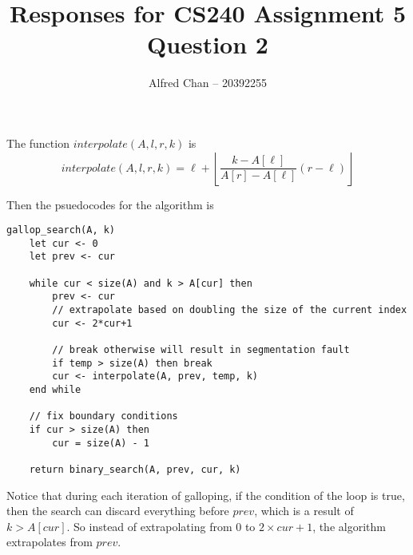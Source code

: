 \documentclass[12pt]{article}
\title{Responses for CS240 Assignment 5 Question 2}
\author{Alfred Chan -- 20392255}
\begin{document}
\maketitle

The function $interpolate(A, l, r, k)$ is
\begin{equation}
interpolate(A, l, r, k) = \ell+\left\lfloor\frac{k-A[\ell]}{A[r]-A[\ell]}(r-\ell)\right\rfloor
\end{equation}

Then the psuedocodes for the algorithm is
\begin{lstlisting}
gallop_search(A, k)
	let cur <- 0
	let prev <- cur

	while cur < size(A) and k > A[cur] then
		prev <- cur
		// extrapolate based on doubling the size of the current index
		cur <- 2*cur+1

		// break otherwise will result in segmentation fault
		if temp > size(A) then break
		cur <- interpolate(A, prev, temp, k)
	end while

	// fix boundary conditions
	if cur > size(A) then
		cur = size(A) - 1

	return binary_search(A, prev, cur, k)
\end{lstlisting}

Notice that during each iteration of galloping, if the condition of the loop is true, then the search can discard everything before $prev$, which is a result of $k > A[cur]$. So instead of extrapolating from 0 to $2 \times cur + 1$, the algorithm extrapolates from $prev$.
\end{document}
